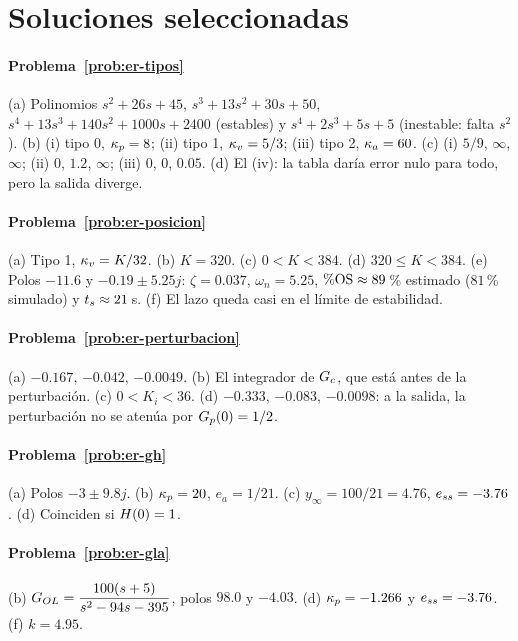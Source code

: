 \section{Soluciones seleccionadas}

\paragraph{Problema~\ref{prob:er-tipos}}
(a) Polinomios $s^2+26s+45$, $s^3+13s^2+30s+50$, $s^4+13s^3+140s^2+1000s+2400$ (estables) y $s^4+2s^3+5s+5$ (inestable: falta $s^2$). (b) (i) tipo 0, $\kappa_p=8$; (ii) tipo 1, $\kappa_v=5/3$; (iii) tipo 2, $\kappa_a=60$. (c) (i) $5/9$, $\infty$, $\infty$; (ii) $0$, $1.2$, $\infty$; (iii) $0$, $0$, $0.05$. (d) El (iv): la tabla daría error nulo para todo, pero la salida diverge.

\paragraph{Problema~\ref{prob:er-posicion}}
(a) Tipo 1, $\kappa_v=K/32$. (b) $K=320$. (c) $0<K<384$. (d) $320\le K<384$. (e) Polos $-11.6$ y $-0.19\pm5.25j$: $\zeta=0.037$, $\omega_n=5.25$, $\%\mathrm{OS}\approx89$\,\% estimado ($81$\,\% simulado) y $t_s\approx21$\,s. (f) El lazo queda casi en el límite de estabilidad.

\paragraph{Problema~\ref{prob:er-perturbacion}}
(a) $-0.167$, $-0.042$, $-0.0049$. (b) El integrador de $G_c$, que está antes de la perturbación. (c) $0<K_i<36$. (d) $-0.333$, $-0.083$, $-0.0098$: a la salida, la perturbación no se atenúa por $G_p(0)=1/2$.

\paragraph{Problema~\ref{prob:er-gh}}
(a) Polos $-3\pm9.8j$. (b) $\kappa_p=20$, $e_a=1/21$. (c) $y_\infty=100/21=4.76$, $e_{ss}=-3.76$. (d) Coinciden si $H(0)=1$.

\paragraph{Problema~\ref{prob:er-gla}}
(b) $G_{OL}=\dfrac{100(s+5)}{s^2-94s-395}$, polos $98.0$ y $-4.03$. (d) $\kappa_p=-1.266$ y $e_{ss}=-3.76$. (f) $k=4.95$.

